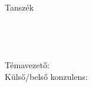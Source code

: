 \begin{titlepage}
    \begin{center}
        \vspace*{\fill}
        \large \textbf{\myuni}\\
        \large \mykar\\
        \large \mytanszek Tanszék\\
        \large \myszak \\
        \vspace{2cm}
        \Huge \textbf{\mydolgozat}\\
        \vspace{2cm}
        \Large \textbf{\mycim}\\
        \vspace{2cm}
        \Large \textbf{\mynev}\\
        \vspace{2cm}
        \large Témavezető: \mytemavezeto\\
        \vspace{1cm}
        \large Külső/belső konzulens: \mykonzulens\\
        \vspace{1cm}
        \large \myev
        \vspace*{\fill}
    \end{center}
\end{titlepage} 